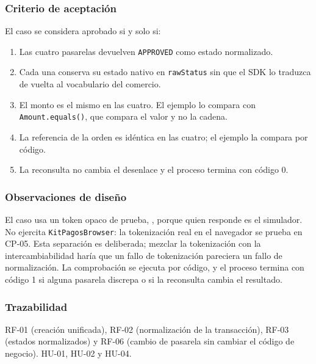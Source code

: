 \subsubsection{Criterio de aceptación}

El caso se considera aprobado si y solo si:

\begin{enumerate}
  \item Las cuatro pasarelas devuelven \texttt{APPROVED} como estado normalizado.
  \item Cada una conserva su estado nativo en \texttt{rawStatus} sin que el SDK lo traduzca de vuelta al vocabulario del comercio.
  \item El monto es el mismo en las cuatro. El ejemplo lo compara con \texttt{Amount.equals()}, que compara el valor y no la cadena.
  \item La referencia de la orden es idéntica en las cuatro; el ejemplo la compara por código.
  \item La reconsulta no cambia el desenlace y el proceso termina con código 0.
\end{enumerate}

\subsubsection{Observaciones de diseño}

El caso usa un token opaco de prueba, , porque quien responde es el simulador. No ejercita \texttt{KitPagosBrowser}: la tokenización real en el navegador se prueba en CP-05. Esta separación es deliberada; mezclar la tokenización con la intercambiabilidad haría que un fallo de tokenización pareciera un fallo de normalización. La comprobación se ejecuta por código, y el proceso termina con código 1 si alguna pasarela discrepa o si la reconsulta cambia el resultado.

\subsubsection{Trazabilidad}

RF-01 (creación unificada), RF-02 (normalización de la transacción), RF-03 (estados normalizados) y RF-06 (cambio de pasarela sin cambiar el código de negocio). HU-01, HU-02 y HU-04.
